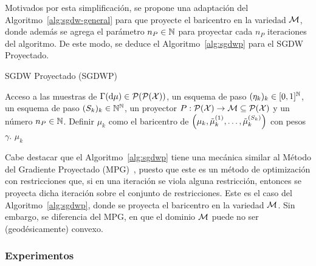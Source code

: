 Motivados por esta simplificación, se propone una adaptación del Algoritmo~\ref{alg:sgdw-general} para que proyecte el baricentro en la variedad $\Manifold$, donde además se agrega el parámetro $n_P\in\N$ para proyectar cada $n_P$ iteraciones del algoritmo. De este modo, se deduce el Algoritmo~\ref{alg:sgdwp} para el SGDW Proyectado.
\begin{algorithm}[H]
    \caption{SGDW Proyectado (SGDWP)}
    \label{alg:sgdwp}
    \begin{algorithmic}[1]
        \Require Acceso a las muestras de $\Gamma(\dd \mu) \in \ProbSpace[\ProbSpace]$, un esquema de paso $(\eta_k)_k \in [0, 1]^\N$, un esquema de paso $(S_k)_k \in \N^\N$, un proyector $P:\ProbSpace[\cX] \to \Manifold\subseteq \ProbSpace[\cX] $ y un número $n_P \in \N$.
        \Repeat
        \State Definir $\mu_k$ como el baricentro de $\qty( \mu_k, \tilde\mu_k^{(1)}, \dots, \tilde\mu_k^{(S_k)} )$ con pesos $\gamma$.
        \EndIf
        \State\Return $\mu_k$
    \end{algorithmic}
\end{algorithm}


Cabe destacar que el Algoritmo~\ref{alg:sgdwp} tiene una mecánica similar al Método del Gradiente Proyectado (MPG)~\cite[Secc. 5.1]{optimizacion2022amaya}, puesto que este es un método de optimización con restricciones que, si en una iteración se viola alguna restricción, entonces se proyecta dicha iteración sobre el conjunto de restricciones. Este es el caso del Algoritmo~\ref{alg:sgdwp}, donde se proyecta el baricentro en la variedad $\Manifold$. Sin embargo, se diferencia del MPG, en que el dominio $\Manifold$ puede no ser (geodésicamente) convexo.


\subsubsection{Experimentos}\label{sssec:sgdwp-experimentos}  %

